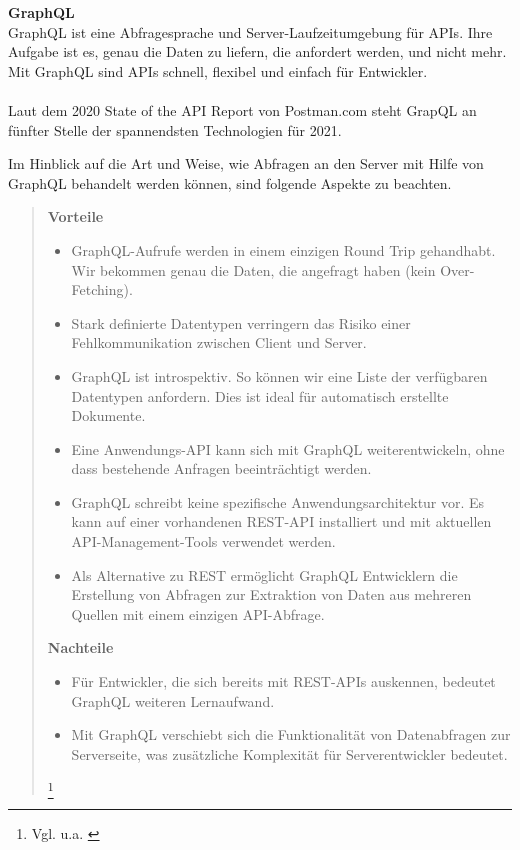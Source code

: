 \textbf{GraphQL}\\
GraphQL ist eine Abfragesprache und Server-Laufzeitumgebung für APIs.
Ihre Aufgabe ist es, genau die Daten zu liefern, die anfordert werden, und nicht mehr.
\\
Mit GraphQL sind APIs schnell, flexibel und einfach für Entwickler.
\\ \\
Laut dem 2020 State of the API Report von Postman.com steht GrapQL an fünfter Stelle der spannendsten Technologien für 2021.

Im Hinblick auf die Art und Weise, wie Abfragen an den Server mit Hilfe von \\ GraphQL behandelt werden können, sind folgende Aspekte zu beachten.
\\
\begin{quote}
    \textbf{Vorteile}\\

    \begin{itemize}
        \item
              GraphQL-Aufrufe werden in einem einzigen Round Trip gehandhabt. Wir bekommen genau die Daten, die angefragt haben (kein Over-Fetching).

        \item
              Stark definierte Datentypen verringern das Risiko einer Fehlkommunikation zwischen Client und Server.

        \item
              GraphQL ist introspektiv. So können wir eine Liste der verfügbaren Datentypen anfordern. Dies ist ideal für automatisch erstellte Dokumente.

        \item
              Eine Anwendungs-API kann sich mit GraphQL weiterentwickeln, ohne dass bestehende Anfragen beeinträchtigt werden.
        \item
              GraphQL schreibt keine spezifische Anwendungsarchitektur vor. Es kann auf einer vorhandenen REST-API installiert und mit aktuellen API-Management-Tools verwendet werden.
        \item
              Als Alternative zu REST ermöglicht GraphQL Entwicklern die Erstellung von Abfragen zur Extraktion von Daten aus mehreren Quellen mit einem einzigen API-Abfrage.

    \end{itemize}
   
    \textbf{Nachteile}
    \begin{itemize}
        \item
        Für Entwickler, die sich bereits mit REST-APIs auskennen, bedeutet GraphQL weiteren Lernaufwand.
     \item 
     Mit GraphQL verschiebt sich die Funktionalität von Datenabfragen zur Serverseite, was zusätzliche Komplexität für Serverentwickler bedeutet.

\end{itemize}

    \footnote{Vgl. u.a. \cite{RH1}}
\end{quote}

